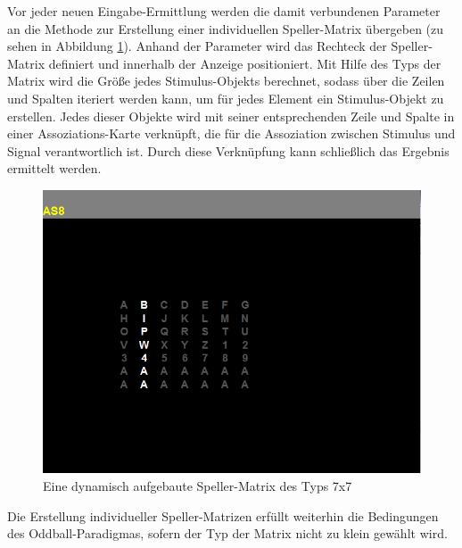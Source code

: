 Vor jeder neuen Eingabe-Ermittlung werden die damit verbundenen Parameter an die Methode zur Erstellung einer individuellen Speller-Matrix übergeben (zu sehen in Abbildung \ref{matrizzen}).
Anhand der Parameter wird das Rechteck der Speller-Matrix definiert und innerhalb der Anzeige positioniert.
Mit Hilfe des Typs der Matrix wird die Größe jedes Stimulus-Objekts berechnet, sodass über die Zeilen und Spalten iteriert werden kann, um für jedes Element ein Stimulus-Objekt zu erstellen.
Jedes dieser Objekte wird mit seiner entsprechenden Zeile und Spalte in einer Assoziations-Karte verknüpft, 
die für die Assoziation zwischen Stimulus und Signal verantwortlich ist.
Durch diese Verknüpfung kann schließlich das Ergebnis ermittelt werden.

\begin{figure}[ht]
\centering
\includegraphics[scale=0.35]{images/customMatrix.png}
\caption{Eine dynamisch aufgebaute Speller-Matrix des Typs 7x7}
\label{matrizzen}
\end{figure}

Die Erstellung individueller Speller-Matrizen erfüllt weiterhin die Bedingungen des Oddball-Paradigmas, sofern der Typ der Matrix nicht zu klein gewählt wird.


















\pagebreak









